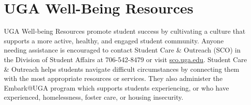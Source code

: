 \documentclass[12pt]{article}
\begin{document}
\clearpage



\section*{\normalsize UGA Well-Being Resources}

UGA Well-being Resources promote student success by cultivating a
culture that supports a more active, healthy, and engaged student
community. Anyone needing assistance is encouraged to contact Student Care \&
Outreach (SCO) in the Division of Student Affairs at 706-542-8479 or
visit \url{sco.uga.edu}. Student Care \& Outreach helps students
navigate difficult circumstances by connecting them with the most
appropriate resources or services. They also administer the Embark@UGA
program which supports students experiencing, or who have experienced,
homelessness, foster care, or housing insecurity. 
\end{document}
